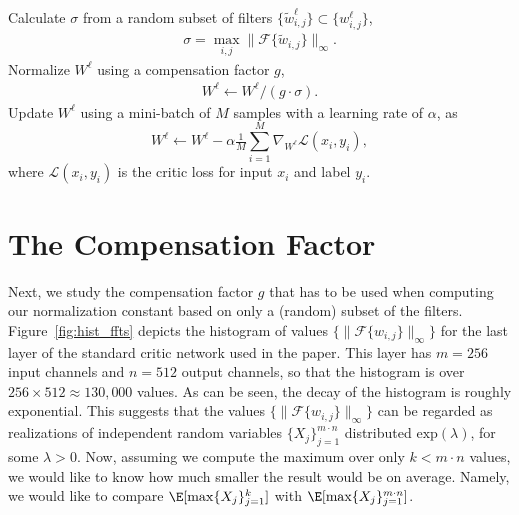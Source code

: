 \begin{algorithm*}
\caption{SGD with sparsity aware normalization (SAN))}\label{alg:san}
\begin{algorithmic}[1]

\State Calculate $\sigma$ from a random subset of filters $\{\tilde{w}^\ell_{i,j}\} \subset \{w^\ell_{i,j}\}$,
\begin{align*}
\sigma = \max_{i,j}\|\mathcal{F}\{\tilde{w}_{i,j}\}\|_\infty.
\end{align*}
\State Normalize $W^\ell$ using a compensation factor $g$,
\begin{align*}
W^\ell \leftarrow W^\ell / (g \cdot \sigma) .
\end{align*}
\State Update $W^\ell$ using a mini-batch of $M$ samples with a learning rate of $\alpha$, as
\begin{equation*}
W^\ell \leftarrow W^\ell - \alpha \tfrac{1}{M}\sum_{i=1}^{M}\nabla_{W^\ell}\mathcal{L}(x_i,y_i), 
\end{equation*}
where $\mathcal{L}(x_i,y_i)$ is the critic loss for input $x_i$ and label $y_i$.

\EndFor


\end{algorithmic}
\end{algorithm*}

\section{The Compensation Factor}
Next, we study the compensation factor $g$ that has to be used when computing our normalization constant based on only a (random) subset of the filters. Figure~\ref{fig:hist_ffts} depicts the histogram of values $\{ \|\mathcal{F}\{w_{i,j}\}\|_\infty\}$ for the last layer of the standard critic network used in the paper. This layer has  $m=256$ input channels and $n=512$ output channels, so that the histogram is over  $256\times 512\approx 130,000$ values. As can be seen, the decay of the histogram is roughly exponential. This suggests that the values $\{ \|\mathcal{F}\{w_{i,j}\}\|_\infty\}$ can be regarded as realizations of independent random variables $\{X_j\}_{j=1}^{m\cdot n}$ distributed $\text{exp}(\lambda)$, for some $\lambda>0$. Now, assuming we compute the maximum over only $k<m\cdot n$ values, we would like to know how much smaller the result would be on average. Namely, we would like to compare $\E[\max \{X_j\}_{j=1}^k]$ with $\E[\max \{X_j\}_{j=1}^{m\cdot n}]$.

